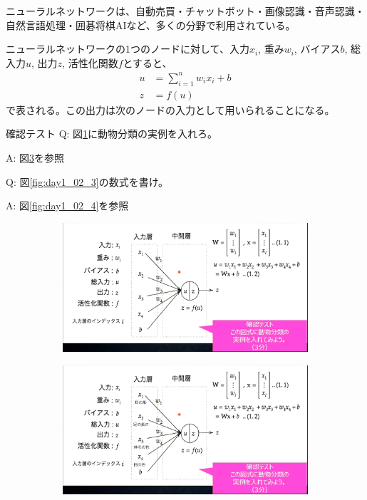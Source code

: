 \documentclass{ltjsarticle}
\begin{document}
\par
ニューラルネットワークは、自動売買・チャットボット・画像認識・音声認識・自然言語処理・囲碁将棋AIなど、多くの分野で利用されている。
\par
ニューラルネットワークの1つのノードに対して、入力$x_i$, 重み$w_i$, バイアス$b$, 総入力$u$, 出力$z$, 活性化関数$f$とすると、
\begin{align}
  u &= \sum_{i=1}^{n}w_ix_i + b \\
  z &= f(u)
\end{align}
で表される。この出力は次のノードの入力として用いられることになる。
\begin{itembox}[l]{確認テスト}
  Q: 図\ref{fig:day1_02_1}に動物分類の実例を入れろ。

  A: 図\ref{fig:day1_02_2}を参照

  Q: 図\ref{fig:day1_02_3}の数式を書け。

  A: 図\ref{fig:day1_02_4}を参照
\end{itembox}
\begin{figure}[ht]
    \centering
    \begin{subfigure}[b]{0.45\textwidth}
      \centering
      \includegraphics[width=\textwidth]{./capture/confirm_test/day1_02_1.png}
      \caption{}
      \label{fig:day1_02_1}
    \end{subfigure}
    \hfill
    \begin{subfigure}[b]{0.45\textwidth}
      \centering
      \includegraphics[width=\textwidth]{./capture/confirm_test/day1_02_2.png}
      \caption{}
      \label{fig:day1_02_2}
    \end{subfigure}
    \caption{}
\end{figure}
\end{document}
